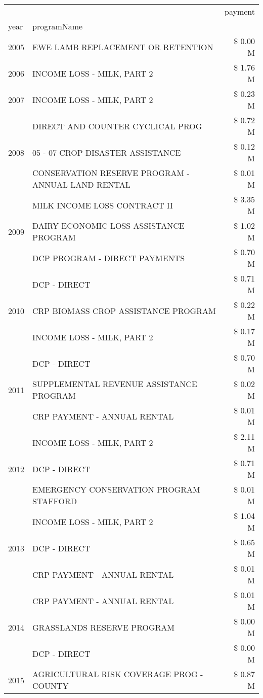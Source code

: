 \begin{tabular}{llr}
\toprule
 &  & payment \\
year & programName &  \\
\midrule
2005 & EWE LAMB REPLACEMENT OR RETENTION & \$ 0.00 M \\
\cline{1-3}
2006 & INCOME LOSS - MILK, PART 2 & \$ 1.76 M \\
\cline{1-3}
2007 & INCOME LOSS - MILK, PART 2 & \$ 0.23 M \\
\cline{1-3}
\multirow[t]{3}{*}{2008} & DIRECT AND COUNTER CYCLICAL PROG & \$ 0.72 M \\
 & 05 - 07 CROP DISASTER ASSISTANCE & \$ 0.12 M \\
 & CONSERVATION RESERVE PROGRAM - ANNUAL LAND RENTAL & \$ 0.01 M \\
\cline{1-3}
\multirow[t]{3}{*}{2009} & MILK INCOME LOSS CONTRACT II & \$ 3.35 M \\
 & DAIRY ECONOMIC LOSS ASSISTANCE PROGRAM & \$ 1.02 M \\
 & DCP PROGRAM - DIRECT PAYMENTS & \$ 0.70 M \\
\cline{1-3}
\multirow[t]{3}{*}{2010} & DCP - DIRECT & \$ 0.71 M \\
 & CRP BIOMASS CROP ASSISTANCE PROGRAM & \$ 0.22 M \\
 & INCOME LOSS - MILK, PART 2 & \$ 0.17 M \\
\cline{1-3}
\multirow[t]{3}{*}{2011} & DCP - DIRECT & \$ 0.70 M \\
 & SUPPLEMENTAL REVENUE ASSISTANCE PROGRAM & \$ 0.02 M \\
 & CRP PAYMENT - ANNUAL RENTAL & \$ 0.01 M \\
\cline{1-3}
\multirow[t]{3}{*}{2012} & INCOME LOSS - MILK, PART 2 & \$ 2.11 M \\
 & DCP - DIRECT & \$ 0.71 M \\
 & EMERGENCY CONSERVATION PROGRAM STAFFORD & \$ 0.01 M \\
\cline{1-3}
\multirow[t]{3}{*}{2013} & INCOME LOSS - MILK, PART 2 & \$ 1.04 M \\
 & DCP - DIRECT & \$ 0.65 M \\
 & CRP PAYMENT - ANNUAL RENTAL & \$ 0.01 M \\
\cline{1-3}
\multirow[t]{3}{*}{2014} & CRP PAYMENT - ANNUAL RENTAL & \$ 0.01 M \\
 & GRASSLANDS RESERVE PROGRAM & \$ 0.00 M \\
 & DCP - DIRECT & \$ 0.00 M \\
\cline{1-3}
\multirow[t]{3}{*}{2015} & AGRICULTURAL RISK COVERAGE PROG - COUNTY & \$ 0.87 M \\

\end{tabular}
